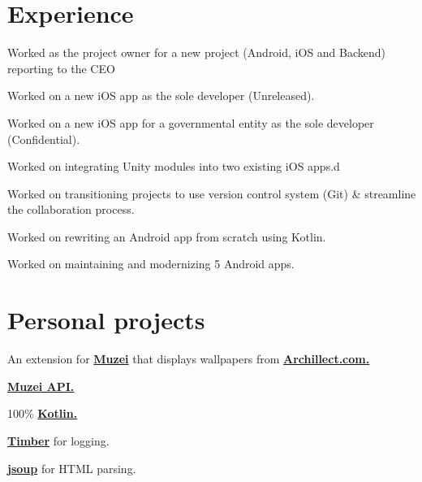 \documentclass[]{Resume}
\begin{document}
\begin{minipage}[t]{0.66\textwidth} 


\section{Experience}
\vspace{\topsep} %
\begin{tightemize}
\item Worked as the project owner for a new project (Android, iOS and Backend) reporting to the CEO
\item Worked on a new iOS app as the sole developer (Unreleased).
\item Worked on a new iOS app for a governmental entity as the sole developer (Confidential).
\item Worked on integrating Unity modules into two existing iOS apps.d
\item Worked on transitioning projects to use version control system (Git) \& streamline the collaboration process.
\item Worked on rewriting an Android app from scratch using Kotlin.
\item Worked on maintaining and modernizing 5 Android apps.
\end{tightemize}
\sectionsep


\section{Personal projects}
An extension for \textbf{\href{http://muzei.co}{Muzei}} that displays wallpapers from \textbf{\href{http://Archillect.com}{Archillect.com.}}
\begin{tightemize}
\item \textbf{\href{http://api.muzei.co}{Muzei API.}}
\item 100\% \textbf{\href{http://kotlinlang.org}{Kotlin.}}
\item \textbf{\href{http://github.com/JakeWharton/timber}{Timber}} for logging.
\item \textbf{\href{http://jsoup.org}{jsoup}} for HTML parsing.
\end{tightemize}
\sectionsep


\end{minipage}
\end{document}
